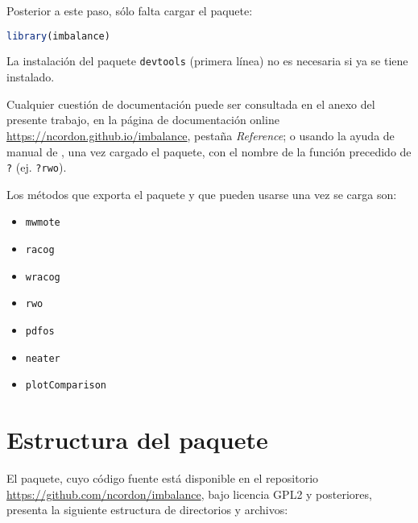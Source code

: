 Posterior a este paso, sólo falta cargar el paquete:

\begin{lstlisting}[language=R,numbers=none]
library(imbalance)
\end{lstlisting}

La instalación del paquete \texttt{devtools} (primera línea) no es necesaria si ya se tiene instalado.

Cualquier cuestión de documentación puede ser consultada en el anexo del presente trabajo, en la página
de documentación online \url{https://ncordon.github.io/imbalance}, pestaña \textit{Reference}; o usando la 
ayuda de manual de \R, una vez cargado el paquete, con el nombre de la función precedido de \texttt{?} (ej. \texttt{?rwo}).


Los métodos que exporta el paquete y que pueden usarse una vez
se carga son:

\begin{itemize}
 \item \texttt{mwmote}
 \item \texttt{racog}
 \item \texttt{wracog}
 \item \texttt{rwo}
 \item \texttt{pdfos}
 \item \texttt{neater}
 \item \texttt{plotComparison}
\end{itemize}

\section{Estructura del paquete}
El paquete, cuyo código fuente está disponible en el repositorio \url{https://github.com/ncordon/imbalance}, 
bajo licencia GPL2 y posteriores, presenta la siguiente estructura de directorios y archivos:

